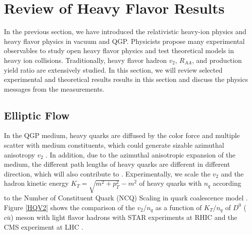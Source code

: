 \chapter{Review of Heavy Flavor Results}

In the previous section, we have introduced the relativistic heavy-ion physics and heavy flavor physics in vacuum and QGP. Physicists propose many experimental observables to study open heavy flavor physics and test theoretical models in heavy ion collisions. Traditionally, heavy flavor hadron $v_2$, $R_{AA}$, and production yield ratio are extensively studied. In this section, we will review selected experimental and theoretical results results in this section and discuss the physics messages from the measurements.


\section{Elliptic Flow}


In the QGP medium, heavy quarks are diffused by the color force and multiple scatter with medium constituents, which could generate sizable azimuthal anisotropy $v_2$ \cite{HQReview}. In addition, due to the azimuthal anisotropic expansion of the medium, the different path lengths of heavy quarks are different in different direction, which will also contribute to . Experimentally, we scale the $v_2$ and the hadron kinetic energy $K_T = \sqrt{m^2 + p_T^2} - m^2$ of heavy quarks with $n_q$ according to the Number of Constituent Quark (NCQ) Scaling in quark coalescence model \cite{NCDScaling}. Figure \ref{HQV2} shows the comparison of the $v_2/n_q$ as a function of $K_T/n_q$ of $D^0$ ($c\bar u$) meson with light flavor hadrons with STAR experiments at RHIC \cite{STARD0v2} and the CMS experiment at LHC \cite{CMSD0v2}.


